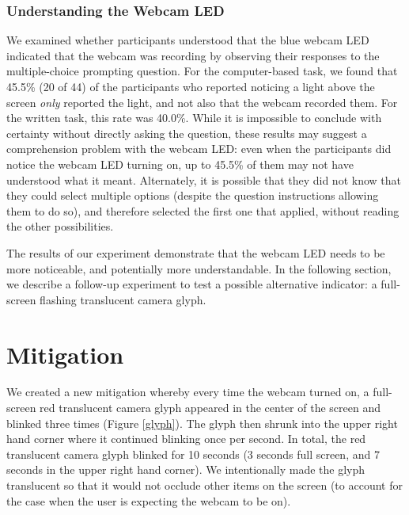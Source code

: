\documentclass{sigchi}
\begin{document}

\subsubsection{Understanding the Webcam LED}

We examined whether participants understood that the blue webcam LED indicated that the webcam was recording by observing their responses to the multiple-choice prompting question. For the computer-based task, we found that 45.5\% (20 of 44) of the participants who reported noticing a light above the screen \textit{only} reported the light, and not also that the webcam recorded them. For the written task, this rate was 40.0\%. While it is impossible to conclude with certainty without directly asking the question, these results may suggest a comprehension problem with the webcam LED: even when the participants did notice the webcam LED turning on, up to 45.5\% of them may not have understood what it meant. Alternately, it is possible that they did not know that they could select multiple options (despite the question instructions allowing them to do so), and therefore selected the first one that applied, without reading the other possibilities. 


The results of our experiment demonstrate that the webcam LED needs to be more noticeable, and potentially more understandable. In the following section, we describe a follow-up experiment to test a possible alternative indicator: a full-screen flashing translucent camera glyph. 

\section{Mitigation}

We created a new mitigation whereby every time the webcam turned on, a full-screen red translucent camera glyph appeared in the center of the screen and blinked three times (Figure \ref{glyph}). The glyph then shrunk into the upper right hand corner where it continued blinking once per second. In total, the red translucent camera glyph blinked for 10 seconds (3 seconds full screen, and 7 seconds in the upper right hand corner). We intentionally made the glyph translucent so that it would not occlude other items on the screen (to account for the case when the user is expecting the webcam to be on). %
\end{document}
